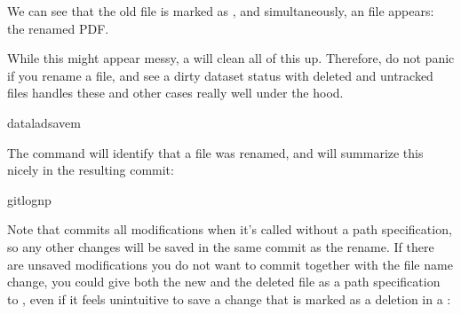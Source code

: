 \sphinxAtStartPar
We can see that the old file is marked as , and
simultaneously, an  file appears: the renamed
PDF.

\sphinxAtStartPar
While this might appear messy, a  will clean
all of this up. Therefore, do not panic if you rename a file,
and see a dirty dataset status with deleted and untracked files
\textendash{}  handles these and other cases really well
under the hood.

\begin{sphinxVerbatim}[commandchars=\\\{\}]
dataladsave\PYGZhy{}m
\end{sphinxVerbatim}

\sphinxAtStartPar
The  command will identify that a file was
renamed, and will summarize this nicely in the resulting commit:

%
\begin{sphinxVerbatim}[commandchars=\\\{\}]
gitlog\PYGZhy{}n\PYGZhy{}p


\end{sphinxVerbatim}
\sphinxresetverbatimhllines

\sphinxAtStartPar
Note that  commits all modifications when
it’s called without a path specification,
so any other changes will be saved in the same commit as the rename.
If there are unsaved modifications you do not want to commit
together with the file name change, you could give both the
new and the deleted file as a path specification to
, even if it feels unintuitive to
save a change that is marked as a deletion in a
:

